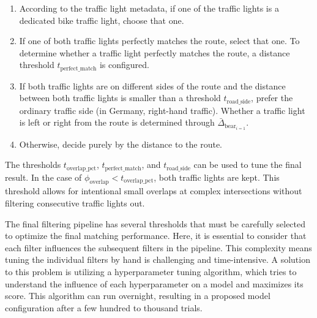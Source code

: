 \begin{enumerate}
    \item According to the traffic light metadata, if one of the traffic lights is a dedicated bike traffic light, choose that one.
    \item If one of both traffic lights perfectly matches the route, select that one. To determine whether a traffic light perfectly matches the route, a distance threshold $t_{\text{perfect\_match}}$ is configured.
    \item If both traffic lights are on different sides of the route and the distance between both traffic lights is smaller than a threshold $t_{\text{road\_side}}$, prefer the ordinary traffic side (in Germany, right-hand traffic). Whether a traffic light is left or right from the route is determined through $\bar{\Delta}_{\text{bear}_{i=1}}$.
    \item Otherwise, decide purely by the distance to the route.
\end{enumerate}

The thresholds $t_{\text{overlap\_pct}}$, $t_{\text{perfect\_match}}$, and $t_{\text{road\_side}}$ can be used to tune the final result. In the case of $\phi_{\text{overlap}} < t_{\text{overlap\_pct}}$, both traffic lights are kept. This threshold allows for intentional small overlaps at complex intersections without filtering consecutive traffic lights out.

The final filtering pipeline has several thresholds that must be carefully selected to optimize the final matching performance. Here, it is essential to consider that each filter influences the subsequent filters in the pipeline. This complexity means tuning the individual filters by hand is challenging and time-intensive. A solution to this problem is utilizing a hyperparameter tuning algorithm, which tries to understand the influence of each hyperparameter on a model and maximizes its score. This algorithm can run overnight, resulting in a proposed model configuration after a few hundred to thousand trials. 

